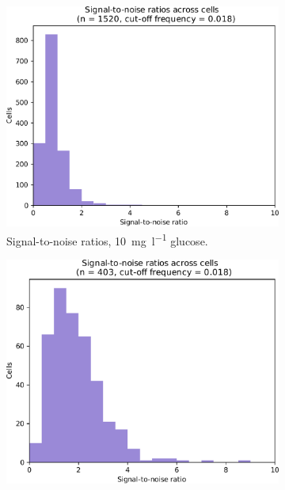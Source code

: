\begin{figure}
  \begin{subfigure}[t]{0.3\textwidth}
   \centering
   \includegraphics[width=\textwidth]{limiting_snr_edit.pdf}
   \caption{
     Signal-to-noise ratios, \SI{10}{\milli\gram~\litre^{-1}} glucose.
   }
   \label{fig:biology-lowglc-snr}
  \end{subfigure}%
  \begin{subfigure}[t]{0.3\textwidth}
   \centering
   \includegraphics[width=\textwidth]{pyruvate_snr_edit.pdf}

\end{subfigure}
\end{figure}
